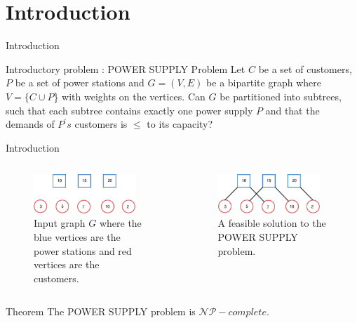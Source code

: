 \section{Introduction}

\begin{frame}{Introduction}
  \begin{block}{Introductory problem : POWER SUPPLY Problem}
  Let $C$ be a set of customers, $P$ be a set of power stations and $G = (V,E)$ be a bipartite graph where $V = \{C \cup P$\} with weights on the vertices.  \hfill \break
  \pause
  Can $G$ be partitioned into subtrees, such that each subtree contains exactly one power supply $P$ and that the demands of $P^{'}s$ customers is $\leq$ to its capacity?
  \end{block}
\end{frame}

\begin{frame}{Introduction}
\begin{columns}
    \begin{column}{0.5\textwidth}
        \begin{figure}
        \centering
        \includegraphics[width=0.9\textwidth]{img/ps1.pdf}
        \caption{Input graph $G$ where the blue vertices are the power stations and red vertices are the customers.}
        \label{fig:ps}
        \end{figure}
    \end{column}
    \pause
    \begin{column}{0.5\textwidth}
        \begin{figure}
        \centering
        \includegraphics[width=0.9\textwidth]{img/ps2.pdf}
        \caption{A feasible solution to the POWER SUPPLY problem.\hfill \break}
        \label{fig:circle}
        \end{figure}
    \end{column}
\end{columns}

\begin{block}{Theorem}
The POWER SUPPLY problem is $\mathcal{NP}-complete$.
\end{block}
\end{frame}

